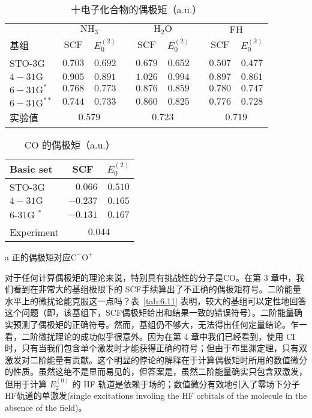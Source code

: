 \begin{table}
	\centering
	\caption{十电子化合物的偶极矩（a.u.）}
	\begin{tabular}{lcccccccc}
		\hline & \multicolumn{2}{c}{$\mathrm{NH}_3$} & & \multicolumn{2}{c}{$\mathrm{H}_2 \mathrm{O}$} & & \multicolumn{2}{c}{$\mathrm{FH}$} \\
		\cline { 2 - 3 } \cline { 8 - 9 } \cline { 8 - 9 } 基组 & $\mathrm{SCF}$ & $E_0^{(2)}$ & & $\mathrm{SCF}$ & $E_0^{(2)}$ & & $\mathrm{SCF}$ & $E_0^{(2)}$ \\
		\hline STO-3G & $0.703$ & $0.692$ & & $0.679$ & $0.652$ & & $0.507$ & $0.477$ \\
		$4-31 \mathrm{G}$ & $0.905$ & $0.891$ & & $1.026$ & $0.994$ & & $0.897$ & $0.861$ \\
		$6-31 \mathrm{G}^*$ & $0.768$ & $0.773$ & & $0.876$ & $0.859$ & & $0.780$ & $0.747$ \\
		$6-31 \mathrm{G}^{* *}$ & $0.744$ & $0.733$ & & $0.860$ & $0.825$ & & $0.776$ & $0.728$ \\
		实验值 & \multicolumn{2}{c}{$0.579$} & & \multicolumn{2}{c}{$0.723$} & & \multicolumn{2}{c}{$0.719$} \\
		\hline
	\end{tabular}
	\label{tab:6.10}
\end{table}

\begin{table}
	\centering
	\caption{CO 的偶极矩（a.u.）}
	\begin{threeparttable}
		\begin{tabular}{lrc}
			\hline Basic set & \multicolumn{1}{c}{ SCF } & $E_0^{(2)}$ \\
			\hline STO-3G & $0.066$ & $0.510$ \\
			$4-31 \mathrm{G}$ & $-0.237$ & $0.165$ \\
			6-31G $^*$ & $-0.131$ & $0.167$ \\
			Experiment & \multicolumn{2}{c}{$0.044$} \\
			\hline
		\end{tabular}
		\begin{tablenotes}
			\item[a] 正的偶极矩对应$\mathrm{C^-O^+}$
		\end{tablenotes}
	\end{threeparttable}
	\label{tab:6.11}
\end{table}

对于任何计算偶极矩的理论来说，特别具有挑战性的分子是CO。在第 3 章中，我们看到在非常大的基组极限下的 SCF手续算出了不正确的偶极矩符号。二阶能量水平上的微扰论能克服这一点吗？表~\autoref{tab:6.11} 表明，较大的基组可以定性地回答这个问题（即，该基组下，SCF偶极矩给出和结果一致的错误符号）。二阶能量确实预测了偶极矩的正确符号。然而，基组仍不够大，无法得出任何定量结论。乍一看，二阶微扰理论的成功似乎很意外。因为在第 4 章中我们已经看到，使用 CI时，只有当我们包含单个激发时才能获得正确的符号；但由于布里渊定理，只有双激发对二阶能量有贡献。这个明显的悖论的解释在于计算偶极矩时所用的数值微分的性质。虽然这绝不是显而易见的，但答案是，虽然二阶能量确实只包含双激发，但用于计算 $E_2^{(0)}$ 的 HF 轨道是依赖于场的；数值微分有效地引入了零场下分子HF轨道的单激发(single excitations involing the HF orbitals of the molecule in the absence of the field)。

